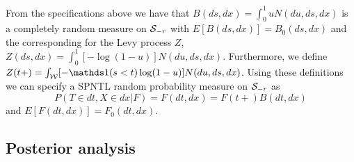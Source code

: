 From the specifications above we have that $B(ds, dx) = \int_0^1 uN(du,ds,dx)$ is a completely random measure on $\mathcal{S}_{-r}$ with $E\left[B(ds, dx)\right] = B_0(ds,dx)$ and the corresponding for the Levy process $Z$, $Z(ds, dx) = \int_0^1 [-\log(1-u)]N(du,ds,dx)$. Furthermore, we define $Z(t+) = \int_{\calW}[-\indicator(s < t)\log(1-u)]N(du,ds,dx)$. Using these definitions we can specify a SPNTL random probability measure on $\mathcal{S}_{-r}$ as 
\begin{equation}
P(T \in dt, X \in dx | F) = F(dt, dx) = F(t+)B(dt, dx)  
\end{equation}
and $E\left[F(dt, dx)\right] = F_0(dt, dx)$.


\subsection{Posterior analysis}\label{SPNTL_posterior}